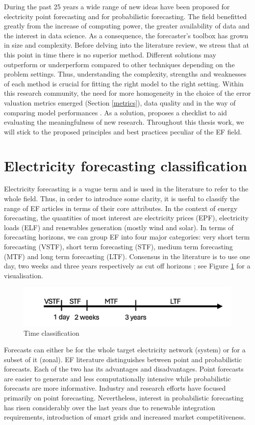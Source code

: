 During the past 25 years a wide range of new ideas have been proposed for electricity point forecasting and for probabilistic forecasting. The field benefitted greatly from the increase of computing power, the greater availability of data and the interest in data science. As a consequence, the forecaster's toolbox has grown in size and complexity. Before delving into the literature review, we stress that at this point in time there is no superior method. Different solutions may outperform or underperform compared to other techniques depending on the problem settings. Thus, understanding the complexity, strengths and weaknesses of each method is crucial for fitting the right model to the right setting. Within this research community, the need for more homogeneity in the choice of the error valuation metrics emerged (Section \ref{metrics}), data quality and in the way of comparing model performances \cite{EPF_review}. As a solution, \cite{lago} proposes a checklist to aid evaluating the meaningfulness of new research. Throughout this thesis work, we will stick to the proposed principles and best practices peculiar of the EF field.

\section{Electricity forecasting classification}
Electricity forecasting is a vague term and is used in the literature to refer to the whole field. Thus, in order to introduce some clarity, it is useful to classify the range of EF articles in terms of their core attributes.
In the context of energy forecasting, the quantities of most interest are electricity prices (EPF), electricity loads (ELF) and renewables generation (mostly wind and solar).
In terms of forecasting horizons, we can group EF into four major categories: very short term forecasting (VSTF), short term forecasting (STF), medium term forecasting (MTF) and long term forecasting (LTF). Consensus in the literature is to use one day, two weeks and three years respectively as cut off horizons \cite{hong_phd}; see Figure \ref{fig:time} for a visualisation. 
\begin{figure}
  \includegraphics[width=\textwidth]{images/time_2.png}
  \caption{Time classification \cite{prob_elf}}
  \label{fig:time}
\end{figure}
Forecasts can either be for the whole target electricity network (system) or for a subset of it (zonal).
EF literature distinguishes between point and probabilistic forecasts. Each of the two has its advantages and disadvantages. Point forecasts are easier to generate and less computationally intensive while probabilistic forecasts are more informative. Industry and research efforts have focused primarily on point forecasting. Nevertheless, interest in probabilistic forecasting has risen considerably over the last years due to renewable integration requirements, introduction of smart grids and increased market competitiveness.
